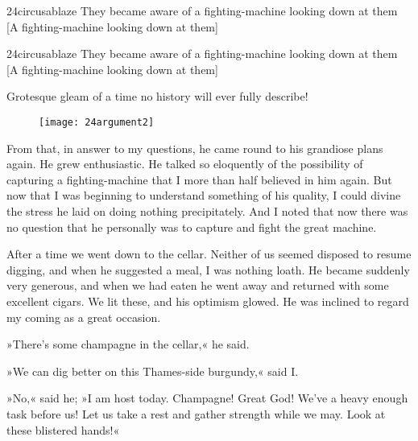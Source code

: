 \begin{letter}
	\begin{bwbigpic}
		[1.2] 
		{24circusablaze} 
		{They became aware of a fighting-machine looking down at them} 
		[A fighting-machine looking down at them]
	\end{bwbigpic}
\end{letter}
\begin{a4}
	\begin{bwbigpic}
		[1.1] 
		{24circusablaze} 
		{They became aware of a fighting-machine looking down at them} 
		[A fighting-machine looking down at them]
	\end{bwbigpic}
\end{a4}

Grotesque gleam of a time no history will ever fully describe!


\begin{figure}[tb]
	\centering
	\texttt{[image: 24argument2]}
\end{figure}

From that, in answer to my questions, he came round to his grandiose plans again. He grew enthusiastic. He talked so eloquently of the possibility of capturing a fighting-machine that I more than half believed in him again. But now that I was beginning to understand something of his quality, I could divine the stress he laid on doing nothing precipitately. And I noted that now there was no question that he personally was to capture and fight the great machine.

After a time we went down to the cellar. Neither of us seemed disposed to resume digging, and when he suggested a meal, I was nothing loath. He became suddenly very generous, and when we had eaten he went away and returned with some excellent cigars. We lit these, and his optimism glowed. He was inclined to regard my coming as a great occasion.

»There's some champagne in the cellar,« he said.

»We can dig better on this Thames-side burgundy,« said I\@.

»No,« said he; »I am host today. Champagne! Great God! We've a heavy enough task before us! Let us take a rest and gather strength while we may. Look at these blistered hands!«

